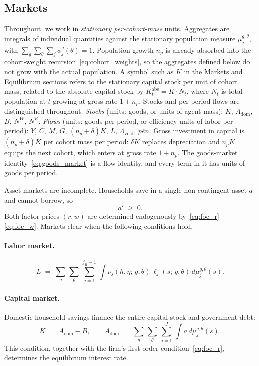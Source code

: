 \documentclass[12pt,a4paper]{article}
\begin{document}
\subsection{Markets}
\label{subsec:markets}
\par Throughout, we work in \emph{stationary per-cohort-mass} units. Aggregates are integrals of individual quantities against the stationary population measure $\mu_j^{g,\theta}$, with $\sum_g \sum_\theta \sum_j \phi_j^{g}(\theta) = 1$. Population growth $n_p$ is already absorbed into the cohort-weight recursion~\eqref{eq:cohort_weights}, so the aggregates defined below do not grow with the actual population. A symbol such as $K$ in the Markets and Equilibrium sections refers to the stationary capital stock per unit of cohort mass, related to the absolute capital stock by $K^{\mathrm{abs}}_t = K \cdot N_t$, where $N_t$ is total population at $t$ growing at gross rate $1+n_p$. Stocks and per-period flows are distinguished throughout. \emph{Stocks} (units: goods, or units of agent mass): $K$, $A_{\mathrm{dom}}$, $B$, $N^W$, $N^R$. \emph{Flows} (units: goods per period, or efficiency units of labor per period): $Y$, $C$, $M$, $G$, $(n_p+\delta) K$, $L$, $\Lambda_{\mathrm{void}}$, $\overline{pen}$. Gross investment in capital is $(n_p+\delta)K$ per cohort mass per period: $\delta K$ replaces depreciation and $n_p K$ equips the next cohort, which enters at gross rate $1+n_p$. The goods-market identity~\eqref{eq:goods_market} is a flow identity, and every term in it has units of goods per period.

\par Asset markets are incomplete. Households save in a single non-contingent asset $a$ and cannot borrow, so
\begin{equation}
\label{eq:borrowing_constraint}
a' \;\geq\; 0.
\end{equation}
Both factor prices $(r, w)$ are determined endogenously by~\eqref{eq:foc_r}--\eqref{eq:foc_w}. Markets clear when the following conditions hold.

\paragraph{Labor market.}
\begin{equation}
\label{eq:labor_market}
L \;=\; \sum_g\, \sum_\theta\, \sum_{j=1}^{j_R - 1}\, \int \nu_j(h, \eta;\, g, \theta)\, \ell_j(s;\, g, \theta)\, d\mu_{j}^{g,\theta}(s).
\end{equation}
\paragraph{Capital market.}
Domestic household savings finance the entire capital stock and government debt:
\begin{equation}
\label{eq:capital_market}
K \;=\; A_{\mathrm{dom}} - B,
\qquad
A_{\mathrm{dom}} \;=\; \sum_g\,\sum_\theta\, \sum_{j=1}^{J}\, \int a\, d\mu_j^{g,\theta}(s).
\end{equation}
This condition, together with the firm's first-order condition~\eqref{eq:foc_r}, determines the equilibrium interest rate.
\end{document}
